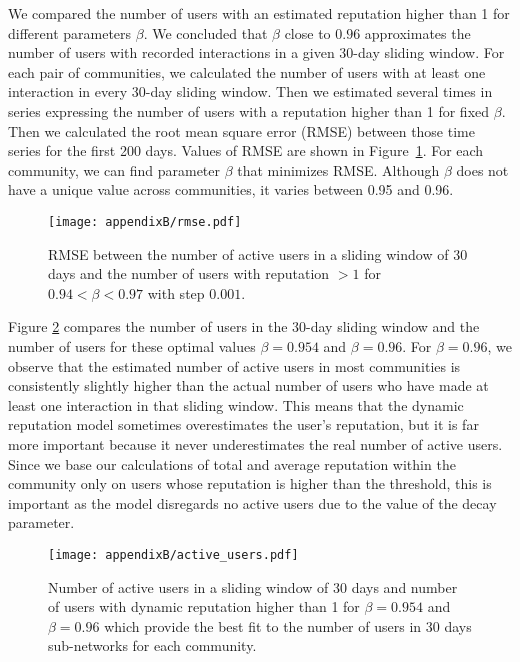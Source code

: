 We compared the number of users with an estimated reputation higher than 1 for different parameters $\beta$. We concluded that $\beta$ close to $0.96$ approximates the number of users with recorded interactions in a given 30-day sliding window. For each pair of communities, we calculated the number of users with at least one interaction in every 30-day sliding window. Then we estimated several times in series expressing the number of users with a reputation higher than 1 for fixed $\beta$. Then we calculated the root mean square error (RMSE) between those time series for the first 200 days. Values of RMSE are shown in Figure~\ref{fig:rmse}. For each community, we can find parameter $\beta$ that minimizes RMSE. Although $\beta$ does not have a unique value across communities, it varies between 0.95 and 0.96.  

\begin{figure}[h!]
	\centering
	\texttt{[image: appendixB/rmse.pdf]}
	\caption[RMSE between the number of users in 30 days sliding window and positive reputation.]{RMSE between the number of active users in a sliding window of 30 days and the number of users with reputation $>1$ for  $0.94< \beta <0.97$ with step $0.001$.}
	\label{fig:rmse}
\end{figure}

Figure \ref{fig:nusers} compares the number of users in the 30-day sliding window and the number of users for these optimal values $\beta = 0.954$ and $\beta =0.96$. For $\beta = 0.96$, we observe that the estimated number of active users in most communities is consistently slightly higher than the actual number of users who have made at least one interaction in that sliding window. This means that the dynamic reputation model sometimes overestimates the user's reputation, but it is far more important because it never underestimates the real number of active users. Since we base our calculations of total and average reputation within the community only on users whose reputation is higher than the threshold, this is important as the model disregards no active users due to the value of the decay parameter.

\begin{figure}[H]
	\centering
	\texttt{[image: appendixB/active\_users.pdf]}
	\caption[Number of users in 30 days sliding window and positive reputation.]{Number of active users in a sliding window of 30 days and number of users with dynamic reputation higher than 1 for $\beta=0.954$ and $\beta=0.96 $ which provide the best fit to the number of users in 30 days sub-networks for each community.}
	\label{fig:nusers}
\end{figure}

